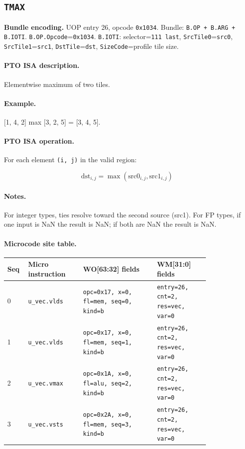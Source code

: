 \subsection{\texttt{TMAX}}
\noindent\textbf{Bundle encoding.} UOP entry 26, opcode \texttt{0x1034}. Bundle: \texttt{B.OP + B.ARG + B.IOTI}. \texttt{B.OP.Opcode}=\texttt{0x1034}. \texttt{B.IOTI}: selector=\texttt{111 last}, \texttt{SrcTile0}=\texttt{src0}, \texttt{SrcTile1}=\texttt{src1}, \texttt{DstTile}=\texttt{dst}, \texttt{SizeCode}=profile tile size.\par\smallskip
{\small
\paragraph{PTO ISA description.}
Elementwise maximum of two tiles.
\paragraph{Example.}
[1, 4, 2] max [3, 2, 5] = [3, 4, 5].
\par\smallskip
\paragraph{PTO ISA operation.}
For each element \texttt{(i, j)} in the valid region:

\[
\mathrm{dst}_{i,j} = \max(\mathrm{src0}_{i,j}, \mathrm{src1}_{i,j})
\]
}\par\smallskip
\paragraph{Notes.}
For integer types, ties resolve toward the second source (src1). For FP types, if one input is NaN the result is NaN; if both are NaN the result is NaN.
\paragraph{Microcode site table.}
{\scriptsize
\begin{longtable}{@{}R{0.055\linewidth}L{0.23\linewidth}L{0.31\linewidth}L{0.22\linewidth}@{}}
\toprule
Seq & Micro instruction & WO[63:32] fields & WM[31:0] fields \\
 & \texttt{u\_vec.vlds} & \texttt{opc=0x17, x=0, fl=mem, seq=0, kind=b} & \texttt{entry=26, cnt=2, res=vec, var=0} \\
1 & \texttt{u\_vec.vlds} & \texttt{opc=0x17, x=0, fl=mem, seq=1, kind=b} & \texttt{entry=26, cnt=2, res=vec, var=0} \\
2 & \texttt{u\_vec.vmax} & \texttt{opc=0x1A, x=0, fl=alu, seq=2, kind=b} & \texttt{entry=26, cnt=2, res=vec, var=0} \\
3 & \texttt{u\_vec.vsts} & \texttt{opc=0x2A, x=0, fl=mem, seq=3, kind=b} & \texttt{entry=26, cnt=2, res=vec, var=0} \\
\bottomrule
\end{longtable}
}
